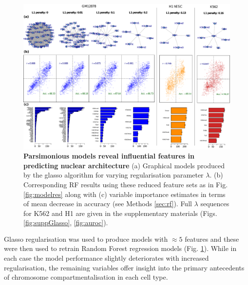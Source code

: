 \documentclass[a4paper]{report}
\begin{document}
\begin{figure}[H] 
\begin{center}
\vspace{-24pt}
\includegraphics[width=1.05\textwidth]{figs/f3_full.pdf}
\captionsetup{width=\textwidth}
\caption{ {\bf Parsimonious models reveal influential features in
    predicting nuclear architecture} (a) Graphical
  models produced by the glasso algorithm\cite{Friedman2008} for 
  varying regularisation parameter $\lambda$. (b) Corresponding RF results using these reduced feature
  sets as in Fig. \ref{fig:modelres} along with (c) variable
  importance estimates in terms of mean decrease in accuracy
  (see
  Methods \ref{sec:rf}). Full $\lambda$ sequences for K562 and H1 are given in the
  supplementary materials (Figs. \ref{fig:suppGlasso}, \ref{fig:auroc}).
} \label{fig:glasso}
\end{center} 
\end{figure} 

Glasso regularisation was used to produce models with $\approx5$
features and these were then used to retrain Random Forest regression
models (Fig. \ref{fig:glasso}). While in each case the model performance slightly deteriorates with increased
  regularisation, the remaining variables offer insight into the
  primary antecedents of chromosome compartmentalisation in each cell
  type. \\
\end{document}
